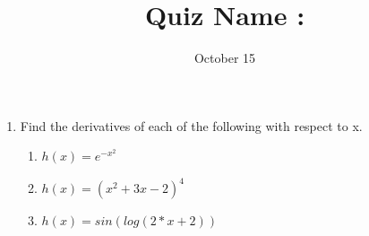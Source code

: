 \documentclass[11pt]{article}
\begin{document}
\title{Quiz \hfill Name : \underline{\hspace{3cm}}}
\date{October 15}
\maketitle
\begin{enumerate}
\item Find the derivatives of each of the following with respect to x.
\begin{enumerate}
\item $h(x)=e^{-x^2}$
\bigskip
\bigskip
\bigskip
\bigskip
\bigskip
\bigskip
\item $h(x)=(x^2+3x-2)^4$
\bigskip
\bigskip
\bigskip
\bigskip
\bigskip
\bigskip
\item $h(x)=sin(log(2*x+2))$
\bigskip
\end{enumerate}
\end{enumerate}
\end{document}
